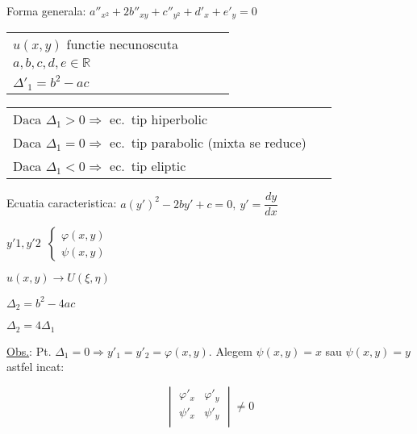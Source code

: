 \documentclass{article}
\begin{document}
Forma generala: $a''_{x^2} + 2b''_{xy} + c''_{y^2} + d'_x + e'_y = 0$

\begin{tabular}{p{0.8\linewidth}}
  $u(x, y)$ functie necunoscuta \\
  $a, b, c, d, e \in\mathbb{R}$ \\
  $\Delta'_1 = b^2 - ac$
\end{tabular}

\begin{tabular}{p{0.8\linewidth}}
  Daca $ \Delta_1 > 0 \Rightarrow$ ec.~tip hiperbolic                  \\
  Daca $ \Delta_1 = 0 \Rightarrow$ ec.~tip parabolic (mixta se reduce) \\
  Daca $ \Delta_1 < 0 \Rightarrow$ ec.~tip eliptic
\end{tabular}

Ecuatia caracteristica: $a(y')^2 - 2by' + c = 0,\ y' = \dfrac{dy}{dx}$

$y'1, y'2$\ $\begin{cases}
    \varphi(x, y) \\
    \psi(x, y)
  \end{cases}$

$u(x, y)\rightarrow U(\xi, \eta)$

$\Delta_2 = b^2 - 4ac$

$\Delta_2 = 4\Delta_1$

\underline{Obs.}: Pt. $ \Delta_1 = 0 \Rightarrow y'_1 = y'_2 = \varphi(x, y) $. Alegem $\psi(x, y) = x$ sau $\psi(x, y) = y$ astfel incat:

\[
  \begin{vmatrix}
    \varphi'_x & \varphi'_y \\
    \psi'_x    & \psi'_y    \\
  \end{vmatrix} \neq 0
\]
\end{document}
